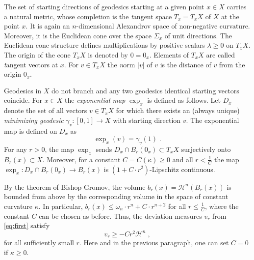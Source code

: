 \documentclass[12pt,leqno]{amsart}
\numberwithin{equation}{section}
\theoremstyle{definition}
\theoremstyle{remark}
\def\:{\colon}
\begin{document}
The set of starting directions of geodesics starting at a given point $x\in X$ carries a natural metric, whose completion is the {\emph tangent space} $T_x=T_xX$
of $X$ at the point $x$.  It is again an $n$-dimensional Alexandrov space of non-negative curvature. Moreover, it is the Euclidean cone
over the space $\Sigma _x$ of unit directions. The Euclidean cone structure defines multiplications by positive scalars $\lambda \geq 0$ on $T_xX$. The origin
of the cone $T_xX$ is denoted by $0=0_x$. Elements of $T_xX$ are called {\emph tangent vectors} at $x$. For $v\in T_xX$ the {\emph norm} $|v|$ of $v$ is the distance of $v$ from the origin $0_x$.


 Geodesics in $X$ do not branch and any two geodesics identical  starting vectors coincide.
For  $x\in X$ the \emph{exponential map}  $\exp_x $ is defined as follows.  Let $D_x$ denote the set of all vectors $v\in T_xX$
 for which there exists an (always unique)  \emph{minimizing geodesic}  $\gamma _v:[0,1] \to X$ with starting direction $v$.  The exponential map is defined on $D_x$ as
 $$\exp _x (v)= \gamma _v(1) \;.$$
 For  any $r>0$, the map $\exp_x$ sends  $D_x\cap B_r (0_x)\subset T_xX$ surjectively onto $B_r(x)\subset X$.
 Moreover, for a constant $C=C(\kappa)\geq 0$  and all $r< \frac 1 C$ the map $\exp_x \:D_x \cap B_r(0_x) \to B_r(x)$ is  $(1+ C \cdot  r^2)$-Lipschitz continuous.



By the theorem of Bishop-Gromov, the volume $b_r (x)=\mathcal H^n (B_r(x))$ is bounded from above by the corresponding volume in the
space of constant curvature $\kappa$. In particular, $b_r (x) \leq \omega _n \cdot r^n + C \cdot r^{n+2}$ for all $r\leq \frac 1 C$, where
the constant $C$ can be chosen as before.  Thus, the deviation measures  $v_r $ from \eqref{eq:first} satisfy
$$v_r \geq -Cr^2 \mathcal H^n \; ,$$  for all sufficiently small $r$.
 Here and in the previous paragraph,  one can set $C=0$ if $\kappa \geq 0$.

\end{document}
